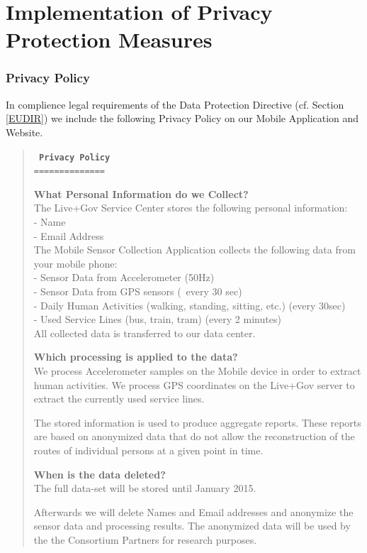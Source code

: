 \chapter{Implementation of Privacy Protection Measures}
\subsection{Privacy Policy}

In complience legal requirements of the Data Protection Directive (cf. Section \ref{EUDIR}) we include the following
Privacy Policy on our Mobile Application and Website.

\begin{quote}
\tt \small
\textbf{Privacy Policy}\\
==============

\textbf{What Personal Information do we Collect?}\\
The Live+Gov Service Center stores the following personal information:\\
- Name\\
- Email Address\\

The Mobile Sensor Collection Application collects the following data from your mobile phone:\\
- Sensor Data from Accelerometer (50Hz)\\
- Sensor Data from GPS sensors (~every 30 sec)\\
- Daily Human Activities (walking, standing, sitting, etc.) (every 30sec)\\
- Used Service Lines (bus, train, tram) (every 2 minutes)\\

All collected data is transferred to our data center.

\textbf{Which processing is applied to the data?}\\
We process Accelerometer samples on the Mobile device in order to extract human activities.
We process GPS coordinates on the Live+Gov server to extract the currently used service lines.

The stored information is used to produce aggregate reports.
These reports are based on anonymized data that do not allow the reconstruction of the routes of individual persons at a given point in time.

\textbf{When is the data deleted?}\\
The full data-set will be stored until January 2015.

Afterwards we will delete Names and Email addresses and anonymize
the sensor data and processing results.  The anonymized data will
be used by the the Consortium Partners for research purposes.


\end{quote}
